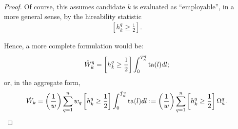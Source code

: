 \documentclass[hidelinks, nonatbib]{elsarticle}
\begin{document}
\begin{corollary}
\begin{proof}
        Of course, this assumes candidate $k$ is evaluated as ``employable'', in a more general sense, by the hireability statistic
        \begin{gather}
            \left[
                h_{k}^{q}
                \geq
                \frac{1}{2}
            \right]
            .
        \end{gather}
        
        Hence, a more complete formulation would be:
        \begin{gather}
            \tilde{W}_{k}^{q}
            =
            \left[
                h_{k}^{q}
                \geq
                \frac{1}{2}
            \right]
            \int_{0}^{\tilde{T}_{\kappa}^{q}}
            \text{ta}(l)
            dl
            ;
        \end{gather}
        or, in the aggregate form,
        \begin{gather}
            \tilde{W}_k 
            = 
            \left(
                \frac{1}{w}
            \right)
            \sum_{q=1}^{n}
            w_q
            \left[
                h_{k}^{q}
                \geq
                \frac{1}{2}
            \right]
            \int_{0}^{\tilde{T}_{\kappa}^{q}}
            \text{ta}(l)
            dl
            :=
            \left(
                \frac{1}{w}
            \right)
            \sum_{q=1}^{n}
            \left[
                h_{k}^{q}
                \geq
                \frac{1}{2}
            \right]
            \Omega_{\kappa}^{q}
            .
        \end{gather}
    \end{proof}        
\end{corollary}

\end{document}
